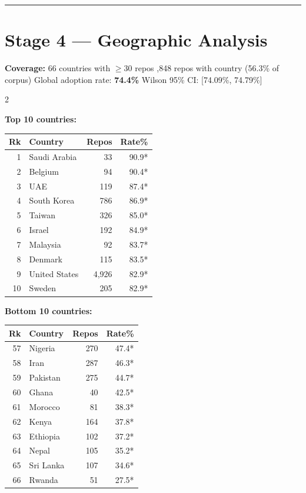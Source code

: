 \documentclass[10pt,a4paper]{article}
\begin{document}
\vspace{6pt}
\hrule
\vspace{6pt}

\newpage
\section*{Stage 4 --- Geographic Analysis}

\textbf{Coverage:} 66 countries with $\geq 30$ repos ,848 repos with country (56.3\% of corpus) \quad
Global adoption rate: \textbf{74.4\%} \quad Wilson 95\% CI: [74.09\%, 74.79\%]

\begin{multicols}{2}

\textbf{Top 10 countries:}

\begin{tabular}{@{}rlrr@{}}
\toprule
Rk & Country & Repos & Rate\% \\
\midrule
 1 & Saudi Arabia  &    33 & 90.9* \\
 2 & Belgium       &    94 & 90.4* \\
 3 & UAE           &   119 & 87.4* \\
 4 & South Korea   &   786 & 86.9* \\
 5 & Taiwan        &   326 & 85.0* \\
 6 & Israel        &   192 & 84.9* \\
 7 & Malaysia      &    92 & 83.7* \\
 8 & Denmark       &   115 & 83.5* \\
 9 & United States & 4,926 & 82.9* \\
10 & Sweden        &   205 & 82.9* \\
\bottomrule
\end{tabular}

\columnbreak

\textbf{Bottom 10 countries:}

\begin{tabular}{@{}rlrr@{}}
\toprule
Rk & Country & Repos & Rate\% \\
\midrule
57 & Nigeria    &   270 & 47.4* \\
58 & Iran       &   287 & 46.3* \\
59 & Pakistan   &   275 & 44.7* \\
60 & Ghana      &    40 & 42.5* \\
61 & Morocco    &    81 & 38.3* \\
62 & Kenya      &   164 & 37.8* \\
63 & Ethiopia   &   102 & 37.2* \\
64 & Nepal      &   105 & 35.2* \\
65 & Sri Lanka  &   107 & 34.6* \\
66 & Rwanda     &    51 & 27.5* \\
\bottomrule
\end{tabular}

\end{multicols}
\end{document}

